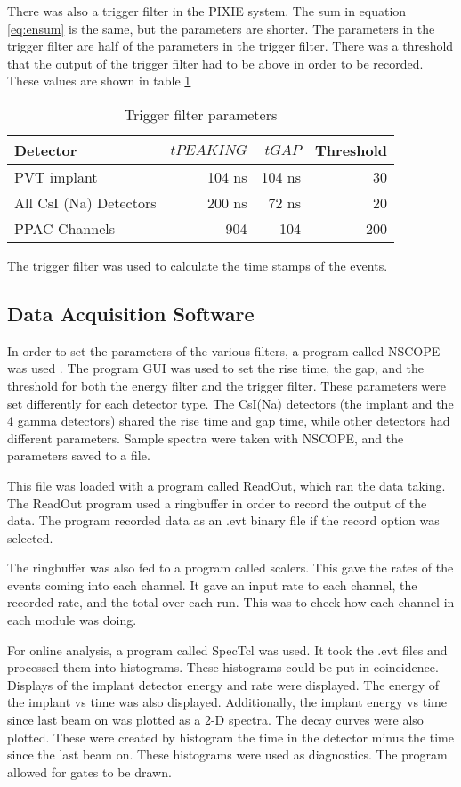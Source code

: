 \documentclass[../MaxHughesThesis.tex]{subfiles}
\begin{document}
There was also a trigger filter in the PIXIE system.
The sum in equation \ref{eq:ensum} is the same, but the parameters are shorter.
The parameters in the trigger filter are half of the parameters in the trigger filter.
There was a threshold that the output of the trigger filter had to be above in order to be recorded.
These values are shown in table \ref{tab:trigfilter}

%
\begin{table}[!hbt]
	\centering
	\caption{Trigger filter parameters}
		\begin{tabular}{lrrr}
		Detector & $tPEAKING$ & $tGAP$ & Threshold\\ \hline
		PVT implant & 104 ns & 104 ns & 30 \\ 
		All CsI (Na) Detectors & 200 ns & 72 ns & 20 \\
		PPAC Channels & 904 & 104 & 200 
		\end{tabular}	
		\label{tab:trigfilter}
\end{table}
%
The trigger filter was used to calculate the time stamps of the events.  

\subsection{Data Acquisition Software}
In order to set the parameters of the various filters, a program called NSCOPE was used \cite{DAQ17}.
The program GUI was used to set the rise time, the gap, and the threshold for both the energy filter and the trigger filter.
These parameters were set differently for each detector type.
The CsI(Na) detectors (the implant and the 4 gamma detectors) shared the rise time and gap time, while other detectors had different parameters.
Sample spectra were taken with NSCOPE, and the parameters saved to a file.

This file was loaded with a program called ReadOut, which ran the data taking.
The ReadOut program used a ringbuffer in order to record the output of the data.
The program recorded data as an .evt binary file if the record option was selected.

The ringbuffer was also fed to a program called scalers.
This gave the rates of the events coming into each channel.
It gave an input rate to each channel, the recorded rate, and the total over each run.
This was to check how each channel in each module was doing.

For online analysis, a program called SpecTcl was used.
It took the .evt files and processed them into histograms.
These histograms could be put in coincidence.
Displays of the implant detector energy and rate were displayed.
The energy of the implant vs time was also displayed.
Additionally, the implant energy vs time since last beam on was plotted as a 2-D spectra.
The decay curves were also plotted.
These were created by histogram the time in the detector minus the time since the last beam on.
These histograms were used as diagnostics. 
The program allowed for gates to be drawn.
\end{document}
